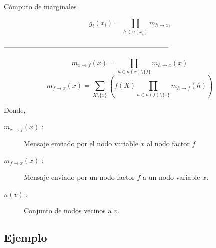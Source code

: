 \documentclass[shownotes]{beamer}
\begin{document}
\begin{frame}

\begin{center}
 C\'omputo de marginales
\end{center}


\begin{equation}
g_i(x_i) = \prod_{h \in n(x_i)} m_{h \rightarrow x_i}
\end{equation} 

\begin{center}
-----------------------------------------------------------------------
\end{center}


\begin{equation}\label{m_v_f} 
m_{x \rightarrow f}(x) = \prod_{h \in n(x) \setminus \{f\} } m_{h \rightarrow x}(x)
\end{equation}
\begin{equation}\label{m_f_v}  
m_{f \rightarrow x}(x) = \sum_{X\setminus \{x\} } \left( f(X) \prod_{h \in n(f) \setminus \{x\} } m_{h \rightarrow f}(h) \right)
\end{equation}

Donde,
\begin{description}
 \item[$m_{x \rightarrow f}(x)$ :] Mensaje enviado por el nodo variable $x$ al nodo factor $f$
 \item[$m_{f \rightarrow x}(x)$ :] Mensaje enviado por un nodo factor $f$ a un nodo variable $x$.
 \item[$n(v)$ :] Conjunto de nodos vecinos a $v$.
\end{description}


\end{frame}


\subsection{Ejemplo}
\end{document}
